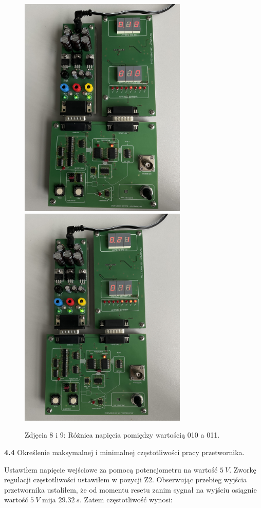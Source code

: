 \documentclass[14pt, table]{extarticle}
\begin{document}
\begin{figure}[H]
\includegraphics[angle=270, width=8cm]{C7}
\includegraphics[angle=270, width=8cm]{C8}
\centering
\captionsetup{labelformat=empty}
\caption{Zdjęcia 8 i 9: Różnica napięcia pomiędzy wartością 010 a 011.}
\end{figure}

\newpage
\textbf{4.4} Określenie maksymalnej i minimalnej częstotliwości pracy przetwornika.

Ustawiłem napięcie wejściowe za pomocą potencjometru na wartość $5 \ V$. Zworkę regulacji częstotliwości ustawiłem w pozycji Z2. Obserwując przebieg wyjścia przetwornika ustaliłem, że od momentu resetu zanim sygnał na wyjściu osiągnie wartość $5 \ V$ mija $29.32 \ s$. Zatem częstotliwość wynosi:
\end{document}
